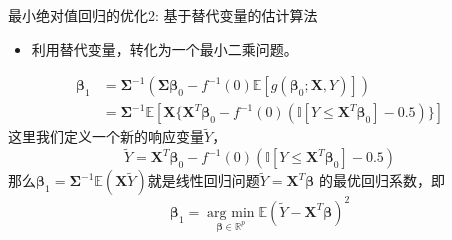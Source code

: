 \begin{frame}{最小绝对值回归的优化2: 基于替代变量的估计算法}
    \begin{itemize}
        \item 利用替代变量，转化为一个最小二乘问题。
    \end{itemize}
    \small
    \begin{equation}
        \begin{split}
        \bm{\beta}_1 &= \bm{\Sigma}^{-1}(\bm{\Sigma}\bm{\beta}_0 - f^{-1}(0)\mathbb{E}[g(\bm{\beta}_0;\bm{X},Y)])\\
        &= \bm{\Sigma}^{-1}\mathbb{E}[\bm{X}\{\bm{X}^T\bm{\beta}_0 - f^{-1}(0)(\mathbb{I}[Y \leq \bm{X}^T\bm{\beta}_0] - 0.5)\}]
        \end{split}
    \end{equation}
    这里我们定义一个新的响应变量$\tilde Y$，
    \begin{equation}
        \tilde Y = \bm{X}^T\bm{\beta}_0 - f^{-1}(0) (\mathbb{I}[Y \leq \bm{X}^T\bm{\beta}_0] - 0.5)
    \end{equation}
    那么$\bm{\beta}_1 = \bm{\Sigma}^{-1}\mathbb{E}(\bm{X}\tilde{Y})$就是线性回归问题$\tilde Y = \bm{X}^T\bm{\beta}$
    的最优回归系数，即
    \begin{equation}\label{beta1-original}
        \bm{\beta}_1 = \underset{\bm{\beta} \in \mathbb{R}^{p}}{\operatorname{arg\ min}} 
        \mathbb{E}(\tilde Y - \bm{X}^T \bm{\beta})^2
    \end{equation}
\end{frame}

